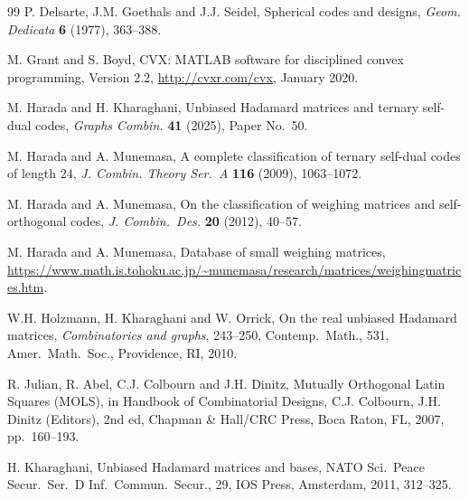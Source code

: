\documentclass[12pt]{article}
\theoremstyle{remark}
\begin{document}
\begin{thebibliography}{99}
P. Delsarte, J.M. Goethals and J.J. Seidel, Spherical codes and designs,
\textsl{Geom. Dedicata} 
\textbf{6} (1977), 363--388.


M. Grant and S. Boyd, 
CVX: MATLAB software for disciplined convex programming, Version 2.2, 
\url{http://cvxr.com/cvx}, January 2020.

M. Harada and H. Kharaghani,
Unbiased Hadamard matrices and ternary self-dual codes,
\textsl{Graphs Combin.}
\textbf{41} (2025), Paper No.~50.

M. Harada and A. Munemasa, 
A complete classification of ternary self-dual codes of length $24$,
\textsl{J. Combin. Theory Ser.~A}
\textbf{116} (2009), 1063--1072.

M. Harada and A. Munemasa, 
On the classification of weighing matrices and self-orthogonal codes,
\textsl{J. Combin.\ Des.}
\textbf{20} (2012), 40--57.

M. Harada and A. Munemasa, 
Database of small weighing matrices,
\url{https://www.math.is.tohoku.ac.jp/~munemasa/research/matrices/weighingmatrices.htm}.


W.H. Holzmann, H. Kharaghani and W. Orrick, 
On the real unbiased Hadamard matrices, 
\textsl{Combinatorics and graphs}, 243--250, 
Contemp.\ Math., 531, Amer.\ Math.\ Soc., Providence, RI, 2010.

R. Julian, R. Abel, C.J. Colbourn and J.H. Dinitz, 
Mutually Orthogonal Latin Squares (MOLS), 
in Handbook of Combinatorial Designs, C.J. Colbourn, J.H. Dinitz (Editors), 2nd ed, Chapman \& Hall/CRC Press, Boca Raton, FL, 2007, pp.~160--193.


H. Kharaghani,
Unbiased Hadamard matrices and bases,
NATO Sci.\ Peace Secur.\ Ser.\ D Inf.\ Commun.\ Secur., 29,
IOS Press, Amsterdam, 2011, 312--325.


\end{thebibliography}
\end{document}
